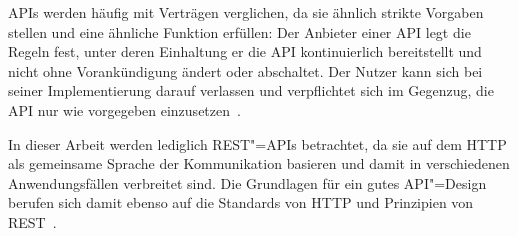 \acp{API} werden häufig mit Verträgen verglichen, da sie ähnlich strikte Vorgaben stellen und eine ähnliche Funktion erfüllen:
Der Anbieter einer \ac{API} legt die Regeln fest, unter deren Einhaltung er die \ac{API} kontinuierlich bereitstellt und nicht ohne Vorankündigung ändert oder abschaltet.
Der Nutzer kann sich bei seiner Implementierung darauf verlassen und verpflichtet sich im Gegenzug, die \ac{API} nur wie vorgegeben einzusetzen~\cites{ope23a}[1627]{cha21}.

In dieser Arbeit werden lediglich \acs{REST}"=\acp{API} betrachtet, da sie auf dem \acf{HTTP} als gemeinsame Sprache der Kommunikation basieren und damit in verschiedenen Anwendungsfällen verbreitet sind.
Die Grundlagen für ein gutes \ac{API}"=Design berufen sich damit ebenso auf die Standards von \ac{HTTP} und Prinzipien von \ac{REST}~\cite[1628]{cha21}.